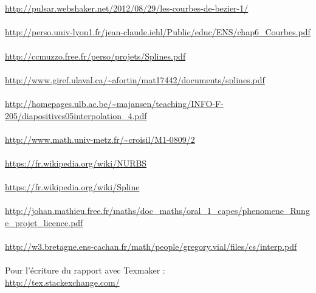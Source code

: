 \documentclass{article}
\begin{document}
\\\\
{\color{blue}
\url{http://pulsar.webshaker.net/2012/08/29/les-courbes-de-bezier-1/}}
\\\\
{\color{blue}
\url{http://perso.univ-lyon1.fr/jean-claude.iehl/Public/educ/ENS/chap6_Courbes.pdf}}
\\\\
{\color{blue}
\url{http://ccmuzzo.free.fr/perso/projets/Splines.pdf}}
\\\\
{\color{blue}
\url{http://www.giref.ulaval.ca/~afortin/mat17442/documents/splines.pdf}}
\\\\
{\color{blue}
\url{http://homepages.ulb.ac.be/~majansen/teaching/INFO-F-205/diapositives05interpolation_4.pdf}}
\\\\
{\color{blue}
\url{http://www.math.univ-metz.fr/~croisil/M1-0809/2}}
\\\\
{\color{blue}
\url{https://fr.wikipedia.org/wiki/NURBS}}
\\\\
{\color{blue}
\url{https://fr.wikipedia.org/wiki/Spline}}
\\\\
{\color{blue}
\url{http://johan.mathieu.free.fr/maths/doc_maths/oral_1_capes/phenomene_Runge_projet_licence.pdf}}
\\\\
{\color{blue}
\url{http://w3.bretagne.ens-cachan.fr/math/people/gregory.vial/files/cs/interp.pdf}}
\\\\
Pour l'\'{e}criture du rapport avec Texmaker :
\\
{\color{blue}
\url{http://tex.stackexchange.com/}}
\end{document}
